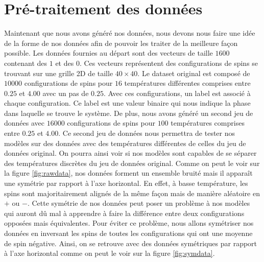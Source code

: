\documentclass[11pt, parskip=half]{scrartcl} %
\begin{document}
\section{Pré-traitement des données}
Maintenant que nous avons généré nos données, nous devons nous faire une idée de la forme de nos données afin de pouvoir les traiter de la meilleure façon possible.
Les données fournies au départ sont des vecteurs de taille $1600$ contenant des $1$ et des $0$. Ces vecteurs représentent des configurations de spins se trouvant sur une grille 2D de taille $40 \times 40$. Le dataset original est composé de $10000$ configurations de spins pour $16$ températures différentes comprises entre $0.25$ et $4.00$ avec un pas de $0.25$.
Avec ces configurations, un label est associé à chaque configuration. Ce label est une valeur binaire qui nous indique la phase dans laquelle se trouve le système.
De plus, nous avons généré un second jeu de données avec $16000$ configurations de spins pour $100$ températures comprises entre $0.25$ et $4.00$. Ce second jeu de données nous permettra de tester nos modèles sur des données avec des températures différentes de celles du jeu de données original. On pourra ainsi voir si nos modèles sont capables de se séparer des températures discrètes du jeu de données original.
Comme on peut le voir sur la figure \ref{fig:rawdata}, nos données forment un ensemble bruité mais il apparaît une symétrie par rapport à l'axe horizontal. En effet, à basse température, les spins sont majoritairement alignés de la même façon mais de manière aléatoire en $+$ ou $-$.
Cette symétrie de nos données peut poser un problème à nos modèles qui auront dû mal à apprendre à faire la différence entre deux configurations opposées mais équivalentes. Pour éviter ce problème, nous allons symétriser nos données en inversant les spins de toutes les configurations qui ont une moyenne de spin négative.
Ainsi, on se retrouve avec des données symétriques par rapport à l'axe horizontal comme on peut le voir sur la figure \ref{fig:symdata}.
\end{document}
